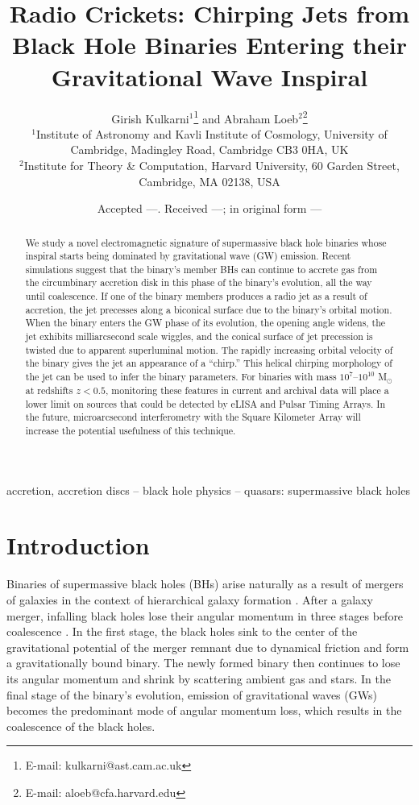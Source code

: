 \documentclass[a4paper,fleqn,usenatbib]{mnras}
\title[Chirping Jets from Black Hole Binaries]{Radio Crickets:
  Chirping Jets from Black Hole Binaries Entering their Gravitational
  Wave Inspiral}
\author[Kulkarni and Loeb]{
Girish Kulkarni$^{1}$\thanks{E-mail: kulkarni@ast.cam.ac.uk}
and Abraham Loeb$^{2}$\thanks{E-mail: aloeb@cfa.harvard.edu}
\\
$^{1}$Institute of Astronomy and Kavli
  Institute of Cosmology, University of Cambridge, Madingley Road,
  Cambridge CB3 0HA, UK\\ 
$^{2}$Institute for Theory \& Computation,
  Harvard University, 60 Garden Street, Cambridge, MA 02138, USA\\ 
}
\date{Accepted ---. Received ---; in original form ---}
\begin{document}
\label{firstpage}
\pagerange{\pageref{firstpage}--\pageref{lastpage}}
\maketitle

\begin{abstract}
  We study a novel electromagnetic signature of supermassive black
  hole binaries whose inspiral starts being dominated by gravitational
  wave (GW) emission.  Recent simulations suggest that the binary's
  member BHs can continue to accrete gas from the circumbinary
  accretion disk in this phase of the binary's evolution, all the way
  until coalescence.  If one of the binary members produces a radio
  jet as a result of accretion, the jet precesses along a biconical
  surface due to the binary's orbital motion.  When the binary enters
  the GW phase of its evolution, the opening angle widens, the jet
  exhibits milliarcsecond scale wiggles, and the conical surface of
  jet precession is twisted due to apparent superluminal motion.  The
  rapidly increasing orbital velocity of the binary gives the jet an
  appearance of a ``chirp.''  This helical chirping morphology of the
  jet can be used to infer the binary parameters.  For binaries with
  mass $10^7$--$10^{10}$ M$_\odot$ at redshifts $z<0.5$, monitoring
  these features in current and archival data will place a lower limit
  on sources that could be detected by eLISA and Pulsar Timing Arrays.
  In the future, microarcsecond interferometry with the Square
  Kilometer Array will increase the potential usefulness of this
  technique.
\end{abstract}

\begin{keywords}
  accretion, accretion discs -- black hole physics -- quasars: supermassive black holes
\end{keywords}

\section{Introduction}
\label{sec:intro}

Binaries of supermassive black holes (BHs) arise naturally as a result
of mergers of galaxies in the context of hierarchical galaxy formation
\citep{2000MNRAS.311..576K, 2002MNRAS.336L..61H, 2008ApJ...676...33D,
  2012MNRAS.422.1306K}.  After a galaxy merger, infalling black holes
lose their angular momentum in three stages before coalescence
\citep{1980Natur.287..307B, 2005LRR.....8....8M, 2011ASL.....4..181C}.
In the first stage, the black holes sink to the center of the
gravitational potential of the merger remnant due to dynamical
friction and form a gravitationally bound binary.  The newly formed
binary then continues to lose its angular momentum and shrink by
scattering ambient gas and stars.  In the final stage of the binary's
evolution, emission of gravitational waves (GWs) becomes the
predominant mode of angular momentum loss, which results in the
coalescence of the black holes.
\end{document}
